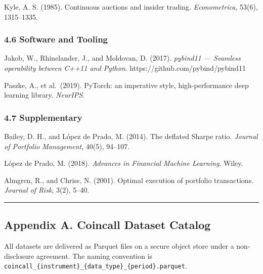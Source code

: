 \documentclass[
]{article}
\begin{document}
Kyle, A. S. (1985). Continuous auctions and insider trading.
\emph{Econometrica}, 53(6), 1315--1335.

\subsubsection{4.6 Software and Tooling}\label{software-and-tooling}

Jakob, W., Rhinelander, J., and Moldovan, D. (2017). \emph{pybind11 ---
Seamless operability between C++11 and Python}.
https://github.com/pybind/pybind11

Paszke, A., et al.~(2019). PyTorch: an imperative style,
high-performance deep learning library. \emph{NeurIPS}.

\subsubsection{4.7 Supplementary}\label{supplementary}

Bailey, D. H., and López de Prado, M. (2014). The deflated Sharpe ratio.
\emph{Journal of Portfolio Management}, 40(5), 94--107.

López de Prado, M. (2018). \emph{Advances in Financial Machine
Learning}. Wiley.

Almgren, R., and Chriss, N. (2001). Optimal execution of portfolio
transactions. \emph{Journal of Risk}, 3(2), 5--40.

\begin{center}\rule{0.5\linewidth}{0.5pt}\end{center}

\subsection{Appendix A. Coincall Dataset
Catalog}\label{appendix-a.-coincall-dataset-catalog}

All datasets are delivered as Parquet files on a secure object store
under a non-disclosure agreement. The naming convention is
\texttt{coincall\_\{instrument\}\_\{data\_type\}\_\{period\}.parquet}.
\end{document}
